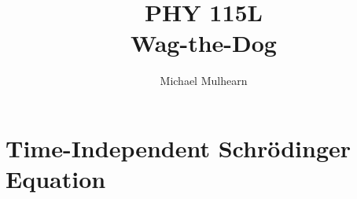 \documentclass[12pt]{book}
\begin{document}
\newcommand{\ihbar}{\ensuremath{i \hbar}}
\newcommand{\Pss}{\ensuremath{\Psi^*}}
\newcommand{\dPsidt}{\ensuremath{ \frac{\partial \Psi}{\partial t} }}
\newcommand{\dPsidx}{\ensuremath{ \frac{\partial \Psi}{\partial x} }}
\newcommand{\ddPsidx}{\ensuremath{ \frac{\partial^2 \Psi}{\partial x^2} }}
\newcommand{\dPssdt}{\ensuremath{ \frac{\partial \Psi^*}{\partial t} }}
\newcommand{\dPssdx}{\ensuremath{ \frac{\partial \Psi^*}{\partial x} }}
\newcommand{\ddPssdx}{\ensuremath{ \frac{\partial^2 \Psi^*}{\partial x^2} }}

\newcommand{\dphidt}{\ensuremath{ \frac{d \phi}{dt} }}
\newcommand{\dpsidx}{\ensuremath{ \frac{d \psi}{dx} }}
\newcommand{\ddpsidx}{\ensuremath{ \frac{d^2 \psi}{dx^2} }}


\title{PHY 115L \\ Wag-the-Dog }
\author{Michael Mulhearn}

\maketitle

\setcounter{chapter}{0}
\chapter{Time-Independent Schr\"odinger Equation}
\end{document}
